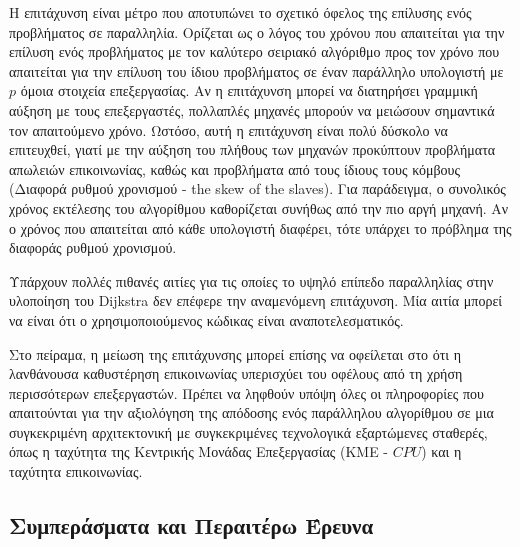 \documentclass[12pt,a4paper]{article}
\begin{document}
Η επιτάχυνση είναι μέτρο που αποτυπώνει το σχετικό όφελος της επίλυσης ενός προβλήματος σε παραλληλία. Ορίζεται ως ο λόγος του χρόνου που απαιτείται για την επίλυση ενός προβλήματος με τον καλύτερο σειριακό αλγόριθμο προς τον χρόνο που απαιτείται για την επίλυση του ίδιου προβλήματος σε έναν παράλληλο υπολογιστή με $p$ όμοια στοιχεία επεξεργασίας. Αν η επιτάχυνση μπορεί να διατηρήσει γραμμική αύξηση με τους επεξεργαστές, πολλαπλές μηχανές μπορούν να μειώσουν σημαντικά τον απαιτούμενο χρόνο. Ωστόσο, αυτή η επιτάχυνση είναι πολύ δύσκολο να επιτευχθεί, γιατί με την αύξηση του πλήθους των μηχανών προκύπτουν προβλήματα απωλειών επικοινωνίας, καθώς και προβλήματα από τους ίδιους τους κόμβους (Διαφορά ρυθμού χρονισμού - \foreignlanguage{english}{the skew of the slaves}). Για παράδειγμα, ο συνολικός χρόνος εκτέλεσης του αλγορίθμου καθορίζεται συνήθως από την πιο αργή μηχανή. Αν ο χρόνος που απαιτείται από κάθε υπολογιστή διαφέρει, τότε υπάρχει το πρόβλημα της διαφοράς ρυθμού χρονισμού.

Υπάρχουν πολλές πιθανές αιτίες για τις οποίες το υψηλό επίπεδο παραλληλίας στην υλοποίηση του \foreignlanguage{english}{Dijkstra} δεν επέφερε την αναμενόμενη επιτάχυνση. Μία αιτία μπορεί να είναι ότι ο χρησιμοποιούμενος κώδικας είναι αναποτελεσματικός. 

Στο πείραμα, η μείωση της επιτάχυνσης μπορεί επίσης να οφείλεται στο ότι η λανθάνουσα καθυστέρηση επικοινωνίας υπερισχύει του οφέλους από τη χρήση περισσότερων επεξεργαστών. Πρέπει να ληφθούν υπόψη όλες οι πληροφορίες που απαιτούνται για την αξιολόγηση της απόδοσης ενός παράλληλου αλγορίθμου σε μια συγκεκριμένη αρχιτεκτονική με συγκεκριμένες τεχνολογικά εξαρτώμενες σταθερές, όπως η ταχύτητα της Κεντρικής Μονάδας Επεξεργασίας (ΚΜΕ - $CPU$) και η ταχύτητα επικοινωνίας.

\subsection{Συμπεράσματα και Περαιτέρω Έρευνα}
\end{document}
